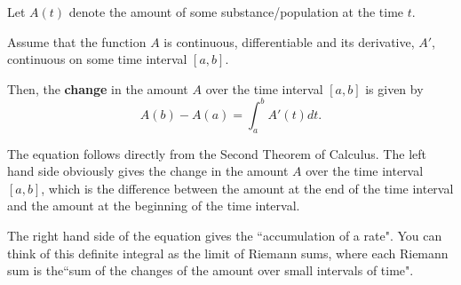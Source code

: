 \documentclass{ximera}
\begin{document}
\begin{theorem}\hfill

Let  $A(t)$ denote the amount of some substance/population at the time $t$.

 Assume that the function $A$ is continuous, differentiable and its derivative, $A'$, continuous on some time interval $[a,b]$.
 
 
Then, the \textbf{change} in the amount $A$ over the time interval $[a,b]$ is given by
\[
A(b)-A(a)=\int_a^bA'(t) dt.
\]
\end{theorem}
\begin {explanation}
The equation follows directly from the Second Theorem of Calculus. 
The left hand side obviously gives the change in the amount $A$ over the time interval $[a,b]$, which is the difference between the amount at the end of the time interval and the amount at the beginning of the time interval. 

The right hand side of the equation gives the ``accumulation of a rate".
You can think of this definite integral as the limit of Riemann sums, where each Riemann sum is the``sum of  the changes of the amount over small intervals of time".
\end {explanation}
\end{document}
